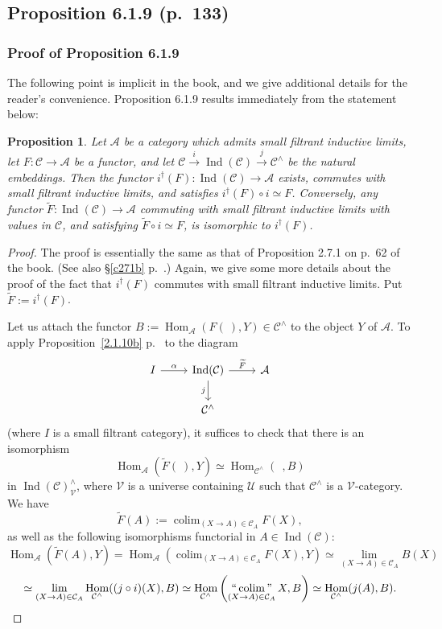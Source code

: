 \documentclass[12pt]{article}%
\newtheorem{prop}[thm]{Proposition}
\theoremstyle{remark}
\theoremstyle{definition}
\newcommand{\A}{\mathcal A}
\newcommand{\C}{\mathcal C}
\newcommand{\U}{\mathcal U}
\newcommand{\V}{\mathcal V}
\newcommand{\xr}{\xrightarrow}
\DeclareMathOperator*{\colim}{colim}%
\DeclareMathOperator*{\icolim}{``\colim"}
\DeclareMathOperator{\Hom}{Hom}%
\DeclareMathOperator{\Ind}{Ind}
\begin{document}

\subsection{Proposition 6.1.9 (p.~133)} 

\subsubsection{Proof of Proposition 6.1.9}

The following point is implicit in the book, and we give additional details for the reader's convenience. Proposition 6.1.9 results immediately from the statement below:

\begin{prop} 
Let $\A$ be a category which admits small filtrant inductive limits, let $F:\C\to\A$ be a functor, and let $\C\xr i\Ind(\C)\xr j\C^\wedge$ be the natural embeddings. Then the functor $i^\dagger(F):\Ind(\C)\to\A$ exists, commutes with small filtrant inductive limits, and satisfies $i^\dagger(F)\circ i\simeq F$. Conversely, any functor $\widetilde F:\Ind(\C)\to\A$ commuting with small filtrant inductive limits with values in $\C$, and satisfying $\widetilde F\circ i\simeq F$, is isomorphic to $i^\dagger(F)$. 
\end{prop} 

\begin{proof}
The proof is essentially the same as that of Proposition 2.7.1 on p.~62 of the book. (See also \S\ref{c271b} p.~\pageref{c271b}.) Again, we give some more details about the proof of the fact that $i^\dagger(F)$ commutes with small filtrant inductive limits. Put $\widetilde F:=i^\dagger(F)$. 

Let us attach the functor $B:=\Hom_\A(F(\ ),Y)\in\C^\wedge$ to the object $Y$ of $\A$. To apply Proposition~\ref{2.1.10b} p.~\pageref{2.1.10b} to the diagram 
$$
\begin{tikzcd}
I\ar{r}{\alpha}&\Ind(\C)\ar{d}[swap]{j}\ar{r}{\widetilde F}&\A\\
&\C^\wedge
\end{tikzcd}
$$
(where $I$ is a small filtrant category), it suffices to check that there is an isomorphism 
$$
\Hom_\A\left(\widetilde F(\ ),Y\right)\simeq
\Hom_{\C^\wedge}(\ \ ,B)
$$ 
in $\Ind(\C)^\wedge_\V$, where $\V$ is a universe containing $\U$ such that $\C^\wedge$ is a $\V$-category. We have 
$$
\widetilde F(A):=\colim_{(X\to A)\in\C_A}F(X),
$$ 
as well as the following isomorphisms functorial in $A\in\Ind(\C)$:
$$
\Hom_\A\left(\widetilde F(A),Y\right)=
\Hom_\A\left(\colim_{(X\to A)\in\C_A}F(X),Y\right)\simeq
\lim_{(X\to A)\in\C_A}B(X)
$$
$$
\simeq
\lim_{(X\to A)\in\C_A}\Hom_{\C^\wedge}((j\circ i)(X),B)
\simeq
\Hom_{\C^\wedge}\left(\icolim_{(X\to A)\in\C_A}X,B\right)\simeq
\Hom_{\C^\wedge}(j(A),B).
$$
\end{proof}
\end{document}
